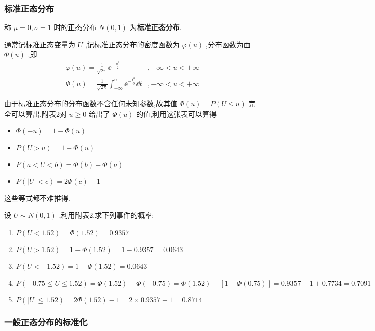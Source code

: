 \subsubsection{标准正态分布}

称 $ \mu=0, \sigma=1 $ 时的正态分布 $ N(0,1) $ 为\textbf{标准正态分布}.

通常记标准正态变量为 $ U $ ,记标准正态分布的密度函数为 $ \varphi(u) $ ,分布函数为面 $ \Phi(u) $ ,即
\[
\begin{array}{ll}
{\varphi(u)=\frac{1}{\sqrt{2 \pi}} \ee ^{-\frac{\mu^{2}}{2}}} & {,-\infty<u<+\infty} \\ 
{\Phi(u)=\frac{1}{\sqrt{2 \pi}} \int_{-\infty}^{u} \ee ^{-\frac{t^{2}}{2}} \dd t} & {,-\infty<u<+\infty}
\end{array}
\]

由于标准正态分布的分布函数不含任何未知参数,故其值 $ \Phi(u)=P(U \leqslant u ) $ 完全可以算出,附表2对 $ u \geqslant 0 $ 给出了 $ \Phi(u) $ 的值,利用这张表可以算得
\begin{itemize}
	\item $ \Phi(-u)=1-\Phi(u) $ 
	\item $ P(U>u)=1-\Phi(u) $ 
	\item $ P(a<U<b)=\Phi(b)-\Phi(a) $ 
	\item $ P(|U|<c)=2 \Phi(c)-1 $ 
\end{itemize}

这些等式都不难推得.

\begin{example}\label{exam:2.5.1}
	设 $ U \sim N(0,1) $ ,利用附表2,求下列事件的概率:
	
	\begin{enumerate}
		\item $ P(U<1.52)=\Phi(1.52)=0.9357 $ 
		\item $ P(U>1.52)=1-\Phi(1.52)=1-0.9357=0.0643 $ 
		\item $ P(U<-1.52)=1-\Phi(1.52)=0.0643 $ 
		\item $ P(-0.75 \leqslant U \leqslant 1.52)=\Phi(1.52)-\Phi(-0.75)=\Phi(1.52)-[1- \Phi(0.75) ]=0.9357-1+0.7734=0.7091 $ 
		\item $ P(|U| \leqslant 1.52)=2 \Phi(1.52)-1=2 \times 0.9357-1=0.8714 $ 
	\end{enumerate}
\end{example}

\subsubsection{一般正态分布的标准化}

